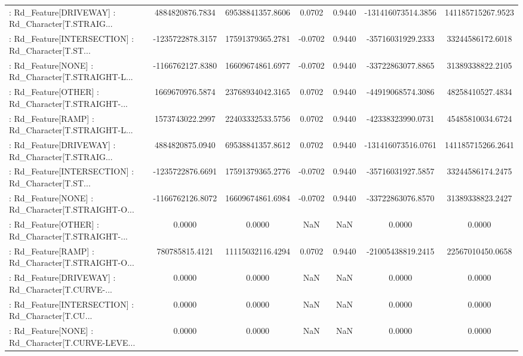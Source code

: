 \begin{longtable}{p{4cm}cccccc}
 : Rd\_Feature[DRIVEWAY] : Rd\_Character[T.STRAIG... &   4884820876.7834 &  69538841357.8606 &  0.0702 &       0.9440 & -131416073514.3856 & 141185715267.9523 \\
 : Rd\_Feature[INTERSECTION] : Rd\_Character[T.ST... &  -1235722878.3157 &  17591379365.2781 & -0.0702 &       0.9440 &  -35716031929.2333 &  33244586172.6018 \\
 : Rd\_Feature[NONE] : Rd\_Character[T.STRAIGHT-L... &  -1166762127.8380 &  16609674861.6977 & -0.0702 &       0.9440 &  -33722863077.8865 &  31389338822.2105 \\
 : Rd\_Feature[OTHER] : Rd\_Character[T.STRAIGHT-... &   1669670976.5874 &  23768934042.3165 &  0.0702 &       0.9440 &  -44919068574.3086 &  48258410527.4834 \\
 : Rd\_Feature[RAMP] : Rd\_Character[T.STRAIGHT-L... &   1573743022.2997 &  22403332533.5756 &  0.0702 &       0.9440 &  -42338323990.0731 &  45485810034.6724 \\
 : Rd\_Feature[DRIVEWAY] : Rd\_Character[T.STRAIG... &   4884820875.0940 &  69538841357.8612 &  0.0702 &       0.9440 & -131416073516.0761 & 141185715266.2641 \\
 : Rd\_Feature[INTERSECTION] : Rd\_Character[T.ST... &  -1235722876.6691 &  17591379365.2776 & -0.0702 &       0.9440 &  -35716031927.5857 &  33244586174.2475 \\
 : Rd\_Feature[NONE] : Rd\_Character[T.STRAIGHT-O... &  -1166762126.8072 &  16609674861.6984 & -0.0702 &       0.9440 &  -33722863076.8570 &  31389338823.2427 \\
 : Rd\_Feature[OTHER] : Rd\_Character[T.STRAIGHT-... &            0.0000 &            0.0000 &     NaN &          NaN &             0.0000 &            0.0000 \\
 : Rd\_Feature[RAMP] : Rd\_Character[T.STRAIGHT-O... &    780785815.4121 &  11115032116.4294 &  0.0702 &       0.9440 &  -21005438819.2415 &  22567010450.0658 \\
 : Rd\_Feature[DRIVEWAY] : Rd\_Character[T.CURVE-... &            0.0000 &            0.0000 &     NaN &          NaN &             0.0000 &            0.0000 \\
 : Rd\_Feature[INTERSECTION] : Rd\_Character[T.CU... &            0.0000 &            0.0000 &     NaN &          NaN &             0.0000 &            0.0000 \\
 : Rd\_Feature[NONE] : Rd\_Character[T.CURVE-LEVE... &            0.0000 &            0.0000 &     NaN &          NaN &             0.0000 &            0.0000 \\

\end{longtable}
